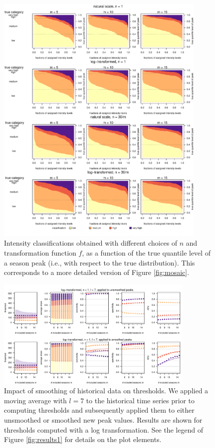 \documentclass[12pt]{article}
\begin{document}
\begin{figure}[h!]
\includegraphics[width=0.9\textwidth]{figure/mosaic_fr_fancy.pdf}
\caption{Intensity classifications obtained with different choices of $n$ and transformation function $f$, as a function of the true quantile level of a season peak (i.e., with respect to the true distribution). This corresponds to a more detailed version of Figure \ref{fig:mosaic}.}
\label{fig:mosaic_fancy}
\end{figure}

\newpage

\begin{figure}[h!]
\center
\includegraphics[width=0.85\textwidth]{figure/plot_smoothing7_fr_small.pdf}
\caption{Impact of smoothing of historical data on thresholds. We applied a moving average with $l = 7$ to the historical time series prior to computing thresholds and subsequently applied them to either unsmoothed or smoothed new peak values. Results are shown for thresholds computed with a log transformation. See the legend of Figure \ref{fig:results1} for details on the plot elements.}
\label{fig:results_smoothing7}
\end{figure}
\end{document}

